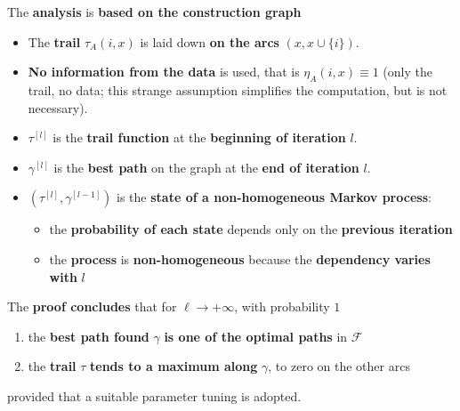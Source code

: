 \documentclass[11pt]{article}
\begin{document}
	The \textbf{analysis} is \textbf{based on the construction graph}
	\begin{itemize}
		\item The \textbf{trail} $\tau_A (i, x)$ is laid down \textbf{on the arcs} $(x, x \cup \{i\})$.\\
		
		\item \textbf{No information from the data} is used, that is $\eta_A (i, x) \equiv 1$ (only the trail, no data; this strange assumption simplifies the computation, but is not necessary).\\
		
		\item $\tau^{[l]}$ is the \textbf{trail function} at the \textbf{beginning of iteration} $l$.\\
		
		\item $\gamma^{[l]}$ is the \textbf{best path} on the graph at the \textbf{end of iteration} $l$.\\
		
		\item $(\tau^{[l]}, \gamma^{[l−1]})$ is the \textbf{state of a non-homogeneous Markov process}:
		\begin{itemize}
			\item the \textbf{probability of each state} depends only on the \textbf{previous iteration}
			
			\item the \textbf{process} is \textbf{non-homogeneous} because the \textbf{dependency varies with} $l$
		\end{itemize}
	\end{itemize}
	
	The \textbf{proof concludes} that for $\ell \rightarrow + \infty$, with probability $1$
	\begin{enumerate}
		\item the \textbf{best path found} $\gamma$ \textbf{is one of the optimal paths} in $\mathcal{F}$
		
		\item the \textbf{trail} $\tau$ \textbf{tends to a maximum along} $\gamma$, to zero on the other arcs
	\end{enumerate}
	provided that a suitable parameter tuning is adopted.\\
	
	\newpage
	
\end{document}
